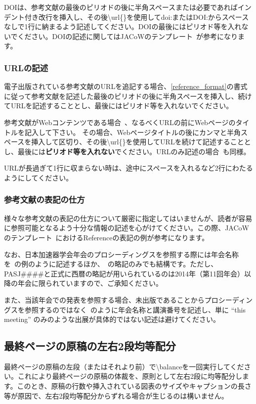 \documentclass{PASJ2026}
\begin{document}
DOIは、参考文献の最後のピリオドの後に半角スペースまたは必要であればインデント付き改行を挿入し、その後\textbackslash{url}\{\}を使用してdoi:またはDOI:からスペースなしで1行に納まるよう記述してください。DOIの最後にはピリオド等を入れないでください。DOIの記述に関してはJACoWのテンプレート~\cite{Reference_JACoW_TeX}が参考になります。

\subsubsection{URLの記述}
電子出版されている参考文献のURLを追記する場合、\ref{reference_format}の書式に従って参考文献を記述した最後のピリオドの後に半角スペースを挿入し、続けてURLを記述することとし、最後にはピリオド等を入れないでください。

参考文献がWebコンテンツである場合~\cite{Reference_2, item:2-1, item:7, item:8}、なるべくURLの前にWebページのタイトルを記入して下さい。
その場合、Webページタイトルの後にカンマと半角スペースを挿入して区切り、その後\textbackslash{url}\{\}を使用してURLを続けて記述することとし、最後には\textbf{ピリオド等を入れない}でください。URLのみ記述の場合~\cite{Reference_1_URL}も同様。

URLが長過ぎて1行に収まらない時は、途中にスペースを入れるなど2行にわたるようにしてください。

\subsubsection{参考文献の表記の仕方}
様々な参考文献の表記の仕方について厳密に指定してはいませんが、読者が容易に参照可能となるよう十分な情報の記述を心がけてください。この際、JACoWのテンプレート~\cite{Reference_JACoW_TeX}におけるReferenceの表記の例が参考になります。

なお、日本加速器学会年会のプロシーディングスを参照する際には年会名称を~\cite{item:9,item:10}の例のように記述するほか、~\cite{item:11,item:12}の略記のみでも結構です。ただし、PASJ\#\#\#\#と正式に西暦の略記が用いられているのは2014年（第11回年会）以降の年会に限られていますので、ご承知ください。

また、当該年会での発表を参照する場合、未出版であることからプロシーディングスを参照するのではなく~\cite{item:13,item:14}のように年会名称と講演番号を記述し、単に ``this meeting'' のみのような出展が具体的ではない記述は避けてください。
%
\subsection{最終ページの原稿の左右2段均等配分}
最終ページの原稿の左段（またはそれより前）で\textbackslash{balance}を一回実行してください。これにより最終ページの原稿の体裁を、原則として左右2段に均等配分します。このとき、原稿の行数や挿入されている図表のサイズやキャプションの長さ等が原因で、左右2段均等配分からずれる場合が生じるのは構いません。
%
\end{document}
